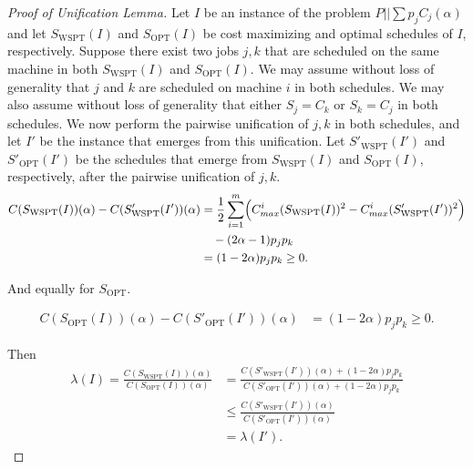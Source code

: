 \documentclass[11pt]{article}
\newcommand{\WSPT}{\mathrm{WSPT}}
\newcommand{\OPT}{\mathrm{OPT}}
\begin{document}
\begin{proof}[Proof of Unification Lemma]
    Let $I$ be an instance of the problem $P||\sum p_jC_j(\alpha)$ and let $S_{\WSPT}(I)$ and $S_{\OPT}(I)$ be cost maximizing and optimal schedules of $I$, respectively.
    Suppose there exist two jobs $j,k$ that are scheduled on the same machine in both $S_{\WSPT}(I)$ and $S_{\OPT}(I)$.
    We may assume without loss of generality that $j$ and $k$ are scheduled on machine $i$ in both schedules. 
    We may also assume without loss of generality that either $S_{j} = C_{k}$ or $S_{k} = C_{j}$ in both schedules.
    We now perform the pairwise unification of $j,k$ in both schedules, and let $I'$ be the instance that emerges from this unification. 
    Let $S'_{\WSPT}(I')$ and $S'_{\OPT}(I')$ be the schedules that emerge from $S_{\WSPT}(I)$ and $S_{\OPT}(I)$, respectively, after the pairwise unification of $j,k$.
    \begin{align*}
        C(S_{\WSPT}(I))(\alpha) - C(S'_{\WSPT}(I'))(\alpha)
        &= \frac12 \sum_{i=1}^{m}
        \Bigl(
            C^{i}_{max}(S_{\WSPT}(I))^2
            - C^{i}_{max}(S'_{\WSPT}(I'))^2
        \Bigr) \\
        &\quad -(2\alpha-1)p_jp_k \\
        &= (1-2\alpha)p_jp_k \ge 0.
    \end{align*}

    And equally for $S_{\OPT}$.

    \begin{align*}
        C(S_{\OPT}(I))(\alpha) - C(S'_{\OPT}(I'))(\alpha)
        &= (1-2\alpha)p_jp_k \ge 0.
    \end{align*}

    Then 
    \begin{align*}
        \lambda(I) = \frac{C(S_{\WSPT}(I))(\alpha)}{C(S_{\OPT}(I))(\alpha)}
        &= \frac{C(S'_{\WSPT}(I'))(\alpha) + (1-2\alpha)p_jp_k}{C(S'_{\OPT}(I'))(\alpha)+ (1-2\alpha)p_jp_k } \\
        &\le \frac{C(S'_{\WSPT}(I'))(\alpha)}{C(S'_{\OPT}(I'))(\alpha)} \\
        &= \lambda(I').
    \end{align*}
    
\end{proof}
\end{document}
